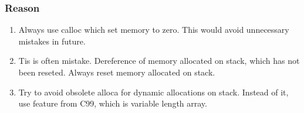 \subsubsection{Reason}
\begin{enumerate}
    \item Always use calloc which set memory to zero. This would avoid unnecessary mistakes in future.
    \item Tis is often mistake. Dereference of memory allocated on stack, which has not been reseted. Always reset memory allocated on stack.
    \item Try to avoid obsolete alloca for dynamic allocations on stack. Instead of it, use feature from C99, which is variable length array.
\end{enumerate}
